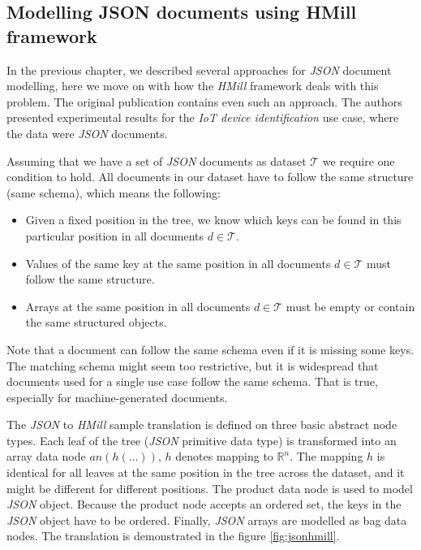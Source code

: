 

\subsection{Modelling JSON documents using HMill framework}
In the previous chapter, we described several approaches for \emph{JSON} document modelling, here we move on with how the \emph{HMill} framework deals with this problem. The original publication \cite{Mandlik2020} contains even such an approach. The authors presented experimental results for the \emph{IoT device identification} use case, where the data were \emph{JSON} documents.

Assuming that we have a set of \emph{JSON} documents as dataset $\mathcal{T}$ we require one condition to hold. All documents in our dataset have to follow the same structure (same schema), which means the following:
\begin{itemize}
    \itemsep0em 
    \item Given a fixed position in the tree, we know which keys can be found in this particular position in all documents $d\in\mathcal{T}$.
    \item Values of the same key at the same position in all documents $d\in\mathcal{T}$ must follow the same structure.
    \item Arrays at the same position in all documents $d\in\mathcal{T}$ must be empty or contain the same structured objects.
\end{itemize}

Note that a document can follow the same schema even if it is missing some keys. The matching schema might seem too restrictive, but it is widespread that documents used for a single use case follow the same schema. That is true, especially for machine-generated documents.

The \emph{JSON} to \emph{HMill} sample translation is defined on three basic abstract node types. Each leaf of the tree (\emph{JSON} primitive data type) is transformed into an array data node $an(h(\dots))$, $h$ denotes mapping to $\mathbb{R}^n$. The mapping $h$ is identical for all leaves at the same position in the tree across the dataset, and it might be different for different positions. The product data node is used to model \emph{JSON} object. Because the product node accepts an ordered set, the keys in the \emph{JSON} object have to be ordered. Finally, \emph{JSON} arrays are modelled as bag data nodes. The translation is demonstrated in the figure \ref{fig:jsonhmill}.

